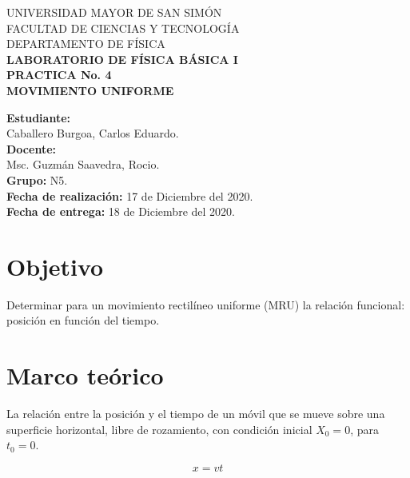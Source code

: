\documentclass[letter,11pt]{article}
\newcommand{\blankpage}{
\newpage
\thispagestyle{empty}
\mbox{}
\newpage
}
\begin{document}
\begin{titlepage}
\begin{center}
{\Large UNIVERSIDAD MAYOR DE SAN SIMÓN}\\
\vspace*{0.15cm}
{\large FACULTAD DE CIENCIAS Y TECNOLOGÍA}\\
\vspace*{0.10cm}
DEPARTAMENTO DE FÍSICA\\
\vspace*{3.0cm}
{\Large \textbf{LABORATORIO DE FÍSICA BÁSICA I}}\\
\vspace*{0.3cm}
{\Large \textbf{PRACTICA No. 4}}\\
\vspace*{3.5cm}
{\Large \textbf{MOVIMIENTO UNIFORME}}\\
\end{center}

\vspace*{7.4cm}
\leftskip=7.95cm
\noindent
\textbf{Estudiante:}\\
Caballero Burgoa, Carlos Eduardo.\\
\newline
\textbf{Docente:}\\
Msc. Guzmán Saavedra, Rocio.\\
\newline
\textbf{Grupo:} N5.\\
\textbf{Fecha de realización:} 17 de Diciembre del 2020.\\
\textbf{Fecha de entrega:} 18 de Diciembre del 2020.\\

\end{titlepage}

\blankpage

\section{Objetivo}
Determinar para un movimiento rectilíneo uniforme (MRU) la relación funcional:
posición en función del tiempo.

\section{Marco teórico}
La relación entre la posición y el tiempo de un móvil que se mueve sobre una
superficie horizontal, libre de rozamiento, con condición inicial $X_0=0$, para
$t_0=0$.

\begin{equation*}
    x = v t
\end{equation*}
\end{document}
